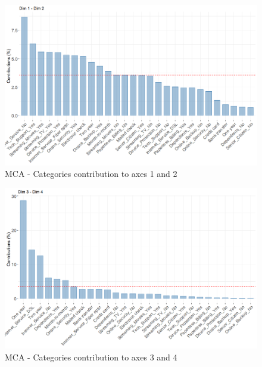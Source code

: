 \documentclass[
]{book}
\begin{document}
\begin{figure}

{\centering \includegraphics[width=15.28in]{./imgs/mca_contrib_12} 

}

\caption{MCA -  Categories contribution to axes 1 and 2}\label{fig:mcacontrib12}
\end{figure}

\begin{figure}

{\centering \includegraphics[width=15.28in]{./imgs/mca_contrib_34} 

}

\caption{MCA -  Categories contribution to axes 3 and 4}\label{fig:mcacontrib34}
\end{figure}
\end{document}
